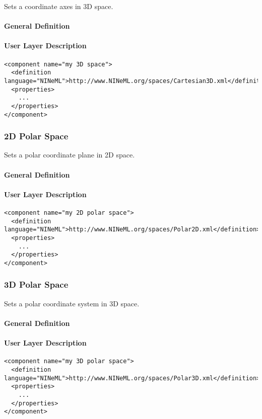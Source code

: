 \documentclass{article}
\begin{document}
Sets a coordinate axes in 3D space.

\paragraph{General Definition}

\paragraph{User Layer Description}
\begin{verbatim}
<component name="my 3D space">
  <definition language="NINeML">http://www.NINeML.org/spaces/Cartesian3D.xml</definition>
  <properties>
    ...
  </properties>
</component>
\end{verbatim}

\subsubsection{2D Polar Space}

Sets a polar coordinate plane in 2D space.

\paragraph{General Definition}

\paragraph{User Layer Description}
\begin{verbatim}
<component name="my 2D polar space">
  <definition language="NINeML">http://www.NINeML.org/spaces/Polar2D.xml</definition>
  <properties>
    ...
  </properties>
</component>
\end{verbatim}

\subsubsection{3D Polar Space}

Sets a polar coordinate system in 3D space.

\paragraph{General Definition}

\paragraph{User Layer Description}
\begin{verbatim}
<component name="my 3D polar space">
  <definition language="NINeML">http://www.NINeML.org/spaces/Polar3D.xml</definition>
  <properties>
    ...
  </properties>
</component>
\end{verbatim}
\end{document}
